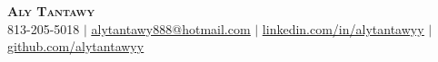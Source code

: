 \begin{center}
	\textbf{\Huge \scshape Aly Tantawy} \\ \vspace{1pt}
	\small 813-205-5018 $|$
    \href{mailto:alytantawy888@hotmail.com}{\underline{alytantawy888@hotmail.com}} $|$
	\href{https://www.linkedin.com/in/alytantawy/}{\underline{linkedin.com/in/alytantawyy}} $|$
	\href{https://github.com/alytantawyy}{\underline{github.com/alytantawyy}}
\end{center}
